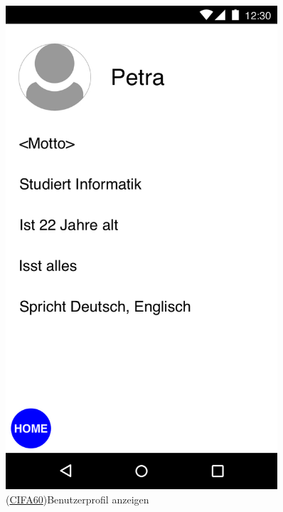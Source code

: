 \documentclass[a4paper]{scrreprt}
\begin{document}
\begin{figure}[H]
	\centering 
	\begin{minipage}[b]{0.48\textwidth} 
		\centering 
		\includegraphics[width=0.9\textwidth]{res/GUI/05.jpeg} 
		\label{Fig.5}
		(\hyperlink{cifa60}{CIFA60})Benutzerprofil anzeigen
	\end{minipage}
	\begin{minipage}[b]{0.48\textwidth} 
		\centering 

\end{minipage}
\end{figure}
\end{document}
